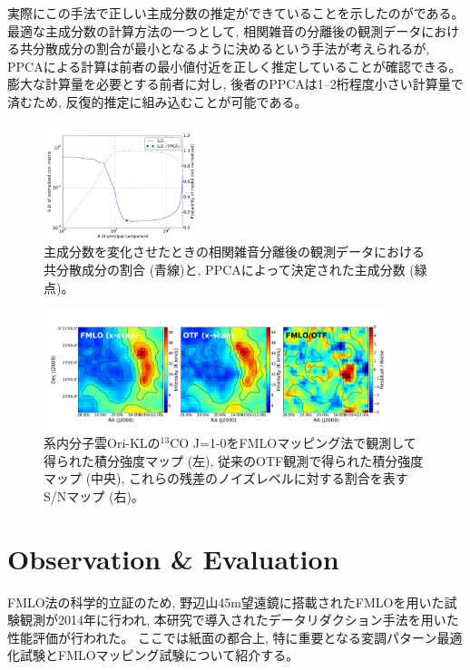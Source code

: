 \documentclass[a4paper,10pt,oneside,twocolumn,notitlepage,final]{jarticle}
\begin{document}
実際にこの手法で正しい主成分数の推定ができていることを示したのがである。
最適な主成分数の計算方法の一つとして, 相関雑音の分離後の観測データにおける共分散成分の割合が最小となるように決めるという手法が考えられるが, PPCAによる計算は前者の最小値付近を正しく推定していることが確認できる。
膨大な計算量を必要とする前者に対し, 後者のPPCAは1--2桁程度小さい計算量で済むため, 反復的推定に組み込むことが可能である。
\begin{figure}[!hb]
    \centering
    \includegraphics[width=0.4\textwidth, bb=0 0 576 400, clip]{fig/ppca_vs_conventional.pdf}
    \caption{主成分数を変化させたときの相関雑音分離後の観測データにおける共分散成分の割合 (青線)と, PPCAによって決定された主成分数 (緑点)。}
    \label{ppca}
\end{figure}
\begin{figure}[!ht]
    \centering
    \includegraphics[width=0.9\textwidth]{fig/otf.pdf}
    \caption{系内分子雲Ori-KLの$^{13}$CO J=1-0をFMLOマッピング法で観測して得られた積分強度マップ (左), 従来のOTF観測で得られた積分強度マップ (中央), これらの残差のノイズレベルに対する割合を表すS/Nマップ (右)。}
    \label{otf}
\end{figure}

\section{Observation \& Evaluation}
FMLO法の科学的立証のため, 野辺山45m望遠鏡に搭載されたFMLOを用いた試験観測が2014年に行われ, 本研究で導入されたデータリダクション手法を用いた性能評価が行われた。
ここでは紙面の都合上, 特に重要となる変調パターン最適化試験とFMLOマッピング試験について紹介する。
\end{document}
